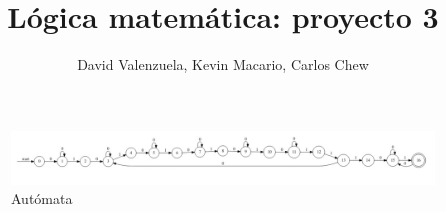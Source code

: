 \documentclass{article}
\title{Lógica matemática: proyecto 3}
\author{David Valenzuela, Kevin Macario, Carlos Chew}
\begin{document}
\maketitle


\begin{figure}[h!]
\centering
\includegraphics[scale=0.3]{Diagrama}
\caption{Autómata}
\label{fig:Diagrama}
\end{figure}
\end{document}
